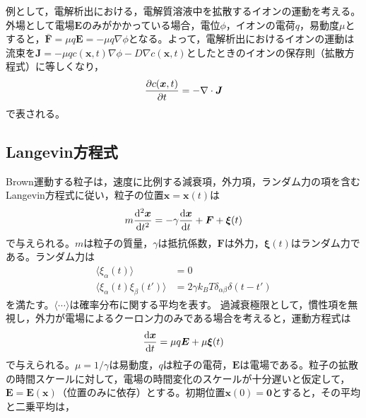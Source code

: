 \documentclass[autodetect-engine,dvi=dvipdfmx,a4paper,ja=standard,oneside,openany]{bxjsbook}
\begin{document}
例として，電解析出における，電解質溶液中を拡散するイオンの運動を考える。外場として電場$\bm{E}$のみがかかっている場合，電位$\phi$，イオンの電荷$q$，易動度$\mu$とすると，$\bm{\bar{F}}=\mu q\bm{E}=-\mu q \nabla\phi$となる。よって，電解析出におけるイオンの運動は流束を$\bm{J}=-\mu qc(\bm{x},t) \nabla\phi-D\nabla c(\bm{x},t)$としたときのイオンの保存則（拡散方程式）に等しくなり，
\begin{equation}
  \pdv{c(\bm{x},t)}{t}=-\nabla\cdot\bm{J}
  \label{eq:RW_diffusion_result_divergence_ion}
\end{equation}
で表される。
\subsection{Langevin方程式}
\label{sec:Langevin}
Brown運動する粒子は，速度に比例する減衰項，外力項，ランダム力の項を含むLangevin方程式に従い，粒子の位置$\bm{x}=\bm{x}(t)$は
\begin{equation}
  m\odv[2]{\bm{x}}{t}=-\gamma\odv{\bm{x}}{t}+\bm{F}+\bm{\xi}(t)
  \label{eq:Langevin}
\end{equation}
で与えられる。$m$は粒子の質量，$\gamma$は抵抗係数，$\bm{F}$は外力，$\bm{\xi}(t)$はランダム力である。ランダム力は
\begin{equation}
  \begin{split}
    \langle\xi_\alpha(t)\rangle              & =0                                             \\
    \langle\xi_\alpha(t)\xi_\beta(t')\rangle & =2\gamma k_B T\delta_{\alpha\beta}\delta(t-t')
  \end{split}
  \label{eq:random_force}
\end{equation}
を満たす。$\langle\cdots\rangle$は確率分布に関する平均を表す。
過減衰極限として，慣性項を無視し，外力が電場によるクーロン力のみである場合を考えると，運動方程式は
\begin{equation}
  \odv{\bm{x}}{t}=\mu q\bm{E}+\mu\bm{\xi}(t)
  \label{eq:Langevin_overdamped}
\end{equation}
で与えられる。$\mu=1/\gamma$は易動度，$q$は粒子の電荷，$\bm{E}$は電場である。粒子の拡散の時間スケールに対して，電場の時間変化のスケールが十分遅いと仮定して，$\bm{E}=\bm{E}(\bm{x})$（位置のみに依存）とする。初期位置$\bm{x}(0)=\bm{0}$とすると，その平均と二乗平均は，
\end{document}
